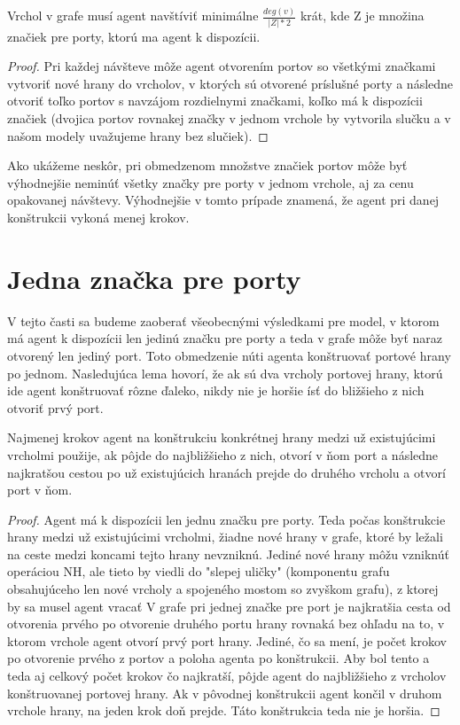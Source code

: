 \begin{lem}
Vrchol v grafe musí agent navštíviť minimálne $\frac{deg(v)}{|Z| * 2} $ krát,
kde Z je množina značiek pre porty, ktorú ma agent k dispozícii.
\end{lem}
\begin{proof}
Pri každej návšteve môže agent otvorením portov so všetkými značkami 
vytvoriť nové hrany do vrcholov, v ktorých sú otvorené príslušné porty 
a následne otvoriť toľko
portov s navzájom rozdielnymi značkami, koľko má k dispozícii značiek
(dvojica portov rovnakej značky v jednom vrchole by vytvorila slučku a v
našom modely uvažujeme hrany bez slučiek).
\end{proof}

Ako ukážeme neskôr, pri obmedzenom množstve značiek portov môže byť
výhodnejšie neminúť všetky značky pre porty v jednom vrchole, aj za cenu
opakovanej návštevy. Výhodnejšie v tomto prípade znamená, že agent pri danej
konštrukcii vykoná menej krokov.



\section{Jedna značka pre porty}
V tejto časti sa budeme zaoberať všeobecnými výsledkami pre model, v ktorom
má agent k dispozícii len jedinú značku pre porty a teda v grafe môže byť
naraz otvorený len jediný port. Toto obmedzenie núti agenta konštruovať
portové hrany po jednom. Nasledujúca lema hovorí, že ak sú dva vrcholy
portovej hrany, ktorú ide agent konštruovať rôzne ďaleko, nikdy nie je
horšie ísť do bližšieho z nich otvoriť prvý port.


\begin{lem}
Najmenej krokov agent na konštrukciu konkrétnej hrany medzi už existujúcimi
vrcholmi použije, ak pôjde do najbližšieho z nich, otvorí v ňom port a
následne najkratšou cestou po už existujúcich hranách prejde do druhého
vrcholu a otvorí port v ňom.
\end{lem}
\begin{proof}
Agent má k dispozícii len jednu značku pre porty. Teda počas konštrukcie
hrany medzi už existujúcimi vrcholmi, žiadne nové hrany v grafe,
 ktoré by ležali na ceste medzi koncami tejto hrany nevzniknú.
 Jediné nové hrany môžu vzniknúť operáciou NH, ale
tieto by viedli do "slepej uličky" (komponentu grafu obsahujúceho len nové
vrcholy a spojeného mostom so zvyškom grafu), z ktorej by sa musel agent vracať 
V grafe
pri jednej značke pre port je najkratšia cesta od otvorenia prvého po
otvorenie druhého portu hrany rovnaká bez ohľadu na to, 
v ktorom vrchole agent otvorí prvý port hrany.
Jediné, čo sa mení, je počet krokov po otvorenie prvého z portov a poloha
agenta po konštrukcii.
Aby bol tento a teda aj celkový počet krokov čo najkratší, pôjde agent do
najbližšieho z vrcholov konštruovanej portovej hrany. Ak v pôvodnej
konštrukcii agent končil v druhom vrchole hrany, na jeden krok doň prejde.
Táto konštrukcia teda nie je horšia.
\end{proof}

